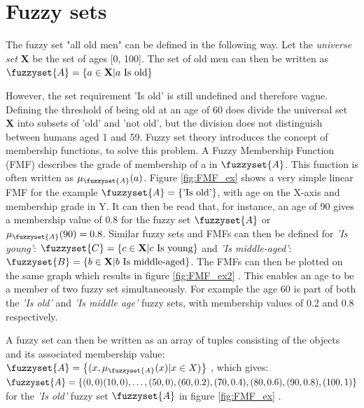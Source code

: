 \section{Fuzzy sets}
\label{sec:fuzzy_sets}
The fuzzy set "all old men" can be defined in the following way. Let the \textit{universe set} \textbf{X} be the set of ages [0, 100]. The set of old men can then be written as
$\fuzzyset{A}=\left \{ a \in \textbf{X} | a \text{ Is old} \right \}$
\cite{chen2000introduction}

However, the set requirement 'Is old' is still undefined and therefore vague. Defining the threshold of being old at an age of 60 does divide the universal set \textbf{X} into subsets of 'old' and 'not old', but the division does not distinguish between humans aged 1 and 59.
Fuzzy set theory introduces the concept of membership functions, to solve this problem. A Fuzzy Membership Function (FMF) describes the grade of membership of a  in  $\fuzzyset{A}$. This function is often written as $\mu_{\fuzzyset{A}}(a)$. Figure \ref{fig:FMF_ex} shows a very simple linear FMF for the example $\fuzzyset{A}=\left \{\text{'Is old'} \right \}$, with age on the X-axis and membership grade in Y. It can then be read that, for instance, an age of 90 gives a membership value of 0.8 for the fuzzy set $\fuzzyset{A}$ or $\mu_{\fuzzyset{A}}(90)=0.8$. Similar fuzzy sets and  FMFs can then be defined for \textit{'Is young'}: $\fuzzyset{C}=\left \{ c \in \textbf{X} | c \text{ Is young} \right \}$ and   \textit{'Is middle-aged'}: $\fuzzyset{B}=\left \{ b \in \textbf{X} | b \text{ Is middle-aged} \right \}$. The FMFs can then be plotted on the same graph which results in figure \ref{fig:FMF_ex2} \cite{ross2009fuzzy}. This enables an age to be a member of two fuzzy set simultaneously. For example the age 60 is part of both the \textit{'Is old'} and \textit{'Is middle age'} fuzzy sets, with membership values of 0.2 and 0.8 respectively.

A fuzzy set can then be written as an array of tuples consisting of the objects and its associated membership value: $\fuzzyset{A}=\left \{(x,\mu_{\fuzzyset{A}}(x)|x \in X) \right \}$ \cite{zimmermann2010fuzzy}, which gives: \\ $\fuzzyset{A}=\left \{(0,0) (10,0), \dots, (50,0), (60,0.2), (70,0.4), (80,0.6), (90,0.8), (100,1) \right \}$ for the  \textit{'Is old'} fuzzy set $\fuzzyset{A}$  in figure \ref{fig:FMF_ex} \cite{ross2009fuzzy}.


